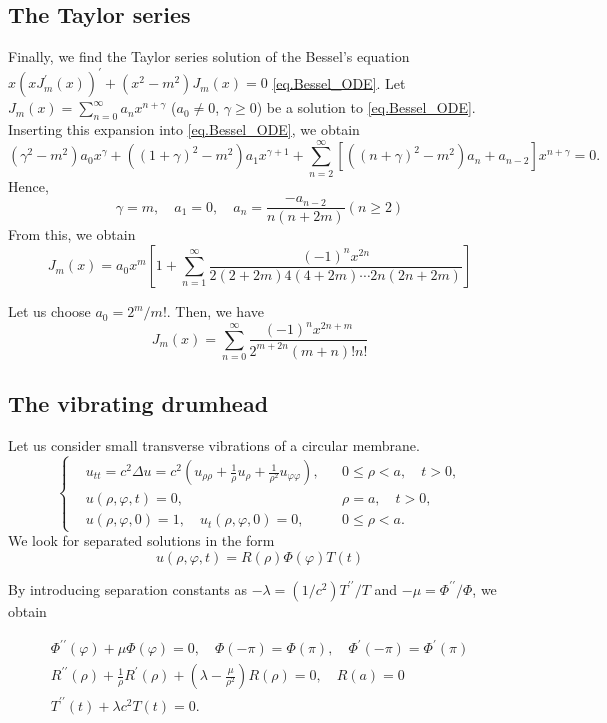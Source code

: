 \subsection{The Taylor series}

Finally, we find the Taylor series solution of the Bessel's equation $x(x J_m^{\prime}(x))^{\prime} + (x^2 - m^2) J_m(x) = 0$ \eqref{eq.Bessel_ODE}. Let $J_m(x)=\sum_{n=0}^{\infty} a_n x^{n+\gamma}$ ($a_0 \neq 0$, $\gamma \geq 0$) be a solution to \eqref{eq.Bessel_ODE}. Inserting this expansion into \eqref{eq.Bessel_ODE}, we obtain
$$
\left(\gamma^2-m^2\right) a_0 x^\gamma+\left((1+\gamma)^2-m^2\right) a_1 x^{\gamma+1}+\sum_{n=2}^{\infty}\left[\left((n+\gamma)^2-m^2\right) a_n+a_{n-2}\right] x^{n+\gamma}=0 .
$$
Hence,
$$
\gamma=m, \quad a_1=0, \quad a_n=\frac{-a_{n-2}}{n(n+2 m)}(n \geq 2)
$$
From this, we obtain
$$
J_m(x)=a_0 x^m\left[1+\sum_{n=1}^{\infty} \frac{(-1)^n x^{2 n}}{2(2+2 m) 4(4+2 m) \cdots 2 n(2 n+2 m)}\right]
$$

Let us choose $a_0=2^m / m!$. Then, we have
$$
J_m(x)=\sum_{n=0}^{\infty} \frac{(-1)^n x^{2 n+m}}{2^{m+2 n}(m+n)!n!}
$$


\subsection{The vibrating drumhead}

Let us consider small transverse vibrations of a circular membrane.
$$
\left\{\begin{aligned}
&u_{tt}=c^2 \Delta u=c^2\left(u_{\rho \rho}+\frac{1}{\rho} u_\rho+\frac{1}{\rho^2} u_{\varphi \varphi}\right), && 0 \leq \rho<a, \quad t>0, 
\\
&u(\rho, \varphi, t)=0, && \rho=a, \quad t>0, 
\\
&u(\rho, \varphi, 0)=1, \quad u_t(\rho, \varphi, 0)=0, && 0 \leq \rho<a .
\end{aligned}\right.
$$
We look for separated solutions in the form
$$
u(\rho, \varphi, t)=R(\rho) \Phi(\varphi) T(t)
$$


By introducing separation constants as $-\lambda=\left(1 / c^2\right) T^{\prime \prime} / T$ and $-\mu=\Phi^{\prime \prime} / \Phi$, we obtain

$$
\begin{array}{r}
\Phi^{\prime \prime}(\varphi)+\mu \Phi(\varphi)=0, \quad \Phi(-\pi)=\Phi(\pi), \quad \Phi^{\prime}(-\pi)=\Phi^{\prime}(\pi) \\
R^{\prime \prime}(\rho)+\frac{1}{\rho} R^{\prime}(\rho)+\left(\lambda-\frac{\mu}{\rho^2}\right) R(\rho)=0, \quad R(a)=0 \\
T^{\prime \prime}(t)+\lambda c^2 T(t)=0 .
\end{array}
$$


